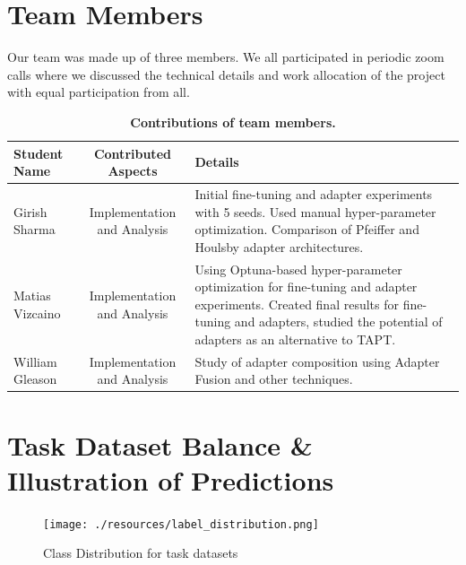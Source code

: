 \documentclass[10pt,twocolumn,letterpaper]{article}
\begin{document}
\appendix
\renewcommand{\thesection}{Appendix \Alph{section}}
\renewcommand{\thefigure}{\Alph{section}.\arabic{figure}}
\renewcommand{\thetable}{\Alph{section}.\arabic{table}}



\section{Team Members}
Our team was made up of three members. We all participated in periodic zoom calls where we discussed the technical details and work allocation of the project with equal participation from all.

\begin{table}[h]
\begin{center}
\begin{tabular}{|l|c|p{8cm}|}
\hline
\textbf{Student Name} & \textbf{Contributed Aspects} & \textbf{Details} \\
\hline
Girish Sharma & Implementation and Analysis & Initial fine-tuning and adapter experiments with 5 seeds. Used manual hyper-parameter optimization. Comparison of Pfeiffer and Houlsby adapter architectures.  \\
Matias Vizcaino & Implementation and Analysis & Using Optuna-based hyper-parameter optimization for fine-tuning and adapter experiments. Created final results for fine-tuning and adapters, studied the potential of adapters as an alternative to TAPT. \\
William Gleason & Implementation and Analysis & Study of adapter composition using Adapter Fusion and other techniques. \\
\hline
\end{tabular}
\end{center}
\caption{\textbf{Contributions of team members.}}
\label{tab:contributions}
\end{table}
\FloatBarrier


\section{Task Dataset Balance \& Illustration of Predictions}
\begin{figure}[h] %
    \centering %
    \texttt{[image: ./resources/label\_distribution.png]} %
    \caption{Class Distribution for task datasets} %
    \label{fig:datasetbalance} %
\end{figure}
\end{document}

